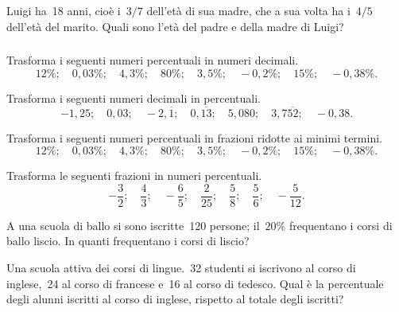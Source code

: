 \begin{esercizio}
 \label{ese:3.78}
Luigi ha~18 anni, cioè i~\(3/7\) dell'età di sua madre, che a sua volta ha 
i~\(4/5\) dell'età del marito. Quali sono l'età del padre e della madre di Luigi?
\end{esercizio}

\subsubsection*{}

\begin{esercizio}
 \label{ese:3.79}
Trasforma i seguenti numeri percentuali in numeri decimali.
\[12\%;\quad0,03\%;\quad4,3\%;\quad80\%;\quad3,5\%;\quad-0,2\%;\quad15\%;
\quad-0,38\%.\]
\end{esercizio}

\begin{esercizio}
 \label{ese:3.80}
Trasforma i seguenti numeri decimali in percentuali.
\[-1,25;\quad0,03;\quad-2,\overline{1};\quad0,\overline{13};\quad5,080;
\quad3,7\overline{52};\quad-0,38.\]
\end{esercizio}

\begin{esercizio}
 \label{ese:3.81}
Trasforma i seguenti numeri percentuali in frazioni ridotte ai minimi termini.
\[12\%;\quad0,03\%;\quad4,3\%;\quad80\%;\quad3,5\%;\quad-0,2\%;\quad15\%;
\quad-0,38\%.\]
\end{esercizio}

\begin{esercizio}
\label{ese:3.82}
Trasforma le seguenti frazioni in numeri percentuali.
\[-\frac{3}{2};\quad\frac{4}{3};\quad-\frac{6}{5};\quad\frac{2}{25};
\quad\frac{5}{8};\quad\frac{5}{6};\quad-\frac{5}{12}.\]
\end{esercizio}

\begin{esercizio}
 \label{ese:3.83}
A una scuola di ballo si sono iscritte~120 persone; il~\(20\%\) frequentano i 
corsi di ballo liscio. In quanti frequentano i corsi di liscio?
\end{esercizio}

\begin{esercizio}
 \label{ese:3.84}
Una scuola attiva dei corsi di lingue.~32 studenti si iscrivono al corso di 
inglese,~24 al corso di francese e~16 al corso di tedesco.
Qual è la percentuale degli alunni iscritti al corso di inglese, rispetto al 
totale degli iscritti?
\end{esercizio}

